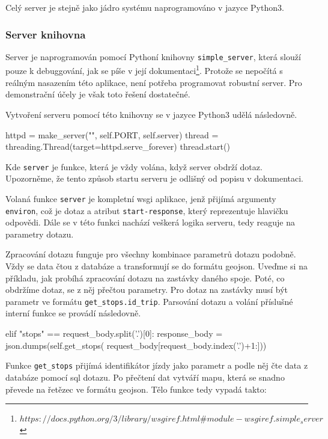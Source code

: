 Celý server je stejně jako jádro systému naprogramováno v jazyce Python3.


\subsubsection{Server knihovna}


Server je naprogramován pomocí Pythoní knihovny \verb-simple_server-, která slouží pouze k debuggování, jak se píše v její dokumentaci\footnote{$https://docs.python.org/3/library/wsgiref.html\#module-wsgiref.simple_server$}. Protože se nepočítá s reálným nasazením této aplikace, není potřeba programovat robustní server. Pro demonstrační účely je však toto řešení dostatečné.


\bigbreak


Vytvoření serveru pomocí této knihovny se v jazyce Python3 udělá následovně.


\begin{code}[frame=none]
httpd = make_server("", self.PORT, self.server)
thread = threading.Thread(target=httpd.serve_forever)
thread.start()
\end{code}


Kde \verb-server- je funkce, která je vždy volána, když server obdrží dotaz. Upozorněme, že tento způsob startu serveru je odlišný od popisu v dokumentaci.


\bigbreak


Volaná funkce \verb-server- je kompletní \gls{wsgi} aplikace, jenž přijímá argumenty \verb-environ-, což je dotaz a atribut \verb:start-response:, který reprezentuje hlavičku odpovědi. Dále se v této funkci nachází veškerá logika serveru, tedy reaguje na parametry dotazu.


\bigbreak


Zpracování dotazu funguje pro všechny kombinace parametrů dotazu podobně. Vždy se data čtou z databáze a transformují se do formátu \gls{geojson}. Uveďme si na příkladu, jak probíhá zpracování dotazu na zastávky daného spoje. Poté, co obdržíme dotaz, se z něj přečtou parametry. Pro dotaz na zastávky musí být parametr ve formátu \verb-get_stops.id_trip-. Parsování dotazu a volání příslušné interní funkce se provádí následovně.


\begin{code}[frame=none]
elif "stops" == request_body.split('.')[0]:
  response_body = json.dumps(self.get_stops(
    request_body[request_body.index('.')+1:]))
\end{code}


Funkce \verb-get_stops- přijímá identifikátor jízdy jako parametr a podle něj čte data z databáze pomocí \gls{sql} dotazu. Po přečtení dat vytváří mapu, která se snadno převede na řetězec ve formátu \gls{geojson}. Tělo funkce tedy vypadá takto:


